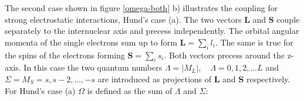 \documentclass[parskip,12pt,headsepline,a4paper] {scrbook}
\begin{document}
The second case shown in figure \ref{omega-both} b) illustrates the coupling for strong electrostatic interactions, Hund's case (a). The two vectors $\boldsymbol{L}$ and $\boldsymbol{S}$ couple separately to the internuclear axis and precess independently. The orbital angular momenta of the single electrons sum up to form $\mathbf{L} = \sum\limits_{i} l_i$. The same is true for the spins of the electrons forming $\mathbf{S} = \sum\limits_{i} s_i$. Both vectors precess around the z-axis. In this case the two quantum numbers $\Lambda = |M_L|,\quad \Lambda = 0, 1, 2,...L$ and $\Sigma = M_S = s, s-2,...,-s$ are introduced as projections of $\boldsymbol{L}$ and $\boldsymbol{S}$ respectively. For Hund's case (a) $\Omega$ is defined as the sum of $\Lambda$ and $\Sigma$:
\end{document}
